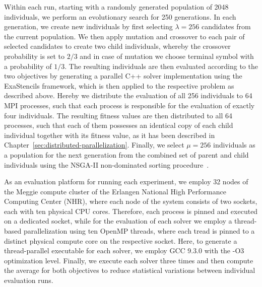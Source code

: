 Within each run, starting with a randomly generated population of 2048 individuals, we perform an evolutionary search for 250 generations.
In each generation, we create new individuals by first selecting $\lambda = 256$ candidates from the current population.
We then apply mutation and crossover to each pair of selected candidates to create two child individuals, whereby the crossover probability is set to $2/3$ and in case of mutation we choose terminal symbol with a probability of $1/3$.
The resulting individuals are then evaluated according to the two objectives by generating a parallel C++ solver implementation using the ExaStencils framework, which is then applied to the respective problem as described above.
Hereby we distribute the evaluation of all 256 individuals to 64 MPI processes, such that each process is responsible for the evaluation of exactly four individuals.
The resulting fitness values are then distributed to all 64 processes, such that each of them possesses an identical copy of each child individual together with its fitness value, as it has been described in Chapter~\ref{sec:distributed-parallelization}.
Finally, we select $\mu = 256$ individuals as a population for the next generation from the combined set of parent and child individuals using the NSGA-II non-dominated sorting procedure~\cite{deb2002fast}.

As an evaluation platform for running each experiment, we employ 32 nodes of the Meggie compute cluster of the Erlangen National High Performance Computing Center (NHR), where each node of the system consists of two sockets, each with ten physical CPU cores.
Therefore, each process is pinned and executed on a dedicated socket, while for the evaluation of each solver we employ a thread-based parallelization using ten OpenMP threads, where each tread is pinned to a distinct physical compute core on the respective socket.
Here, to generate a thread-parallel executable for each solver, we employ GCC 9.3.0 with the -O3 optimization level.
Finally, we execute each solver three times and then compute the average for both objectives to reduce statistical variations between individual evaluation runs.

